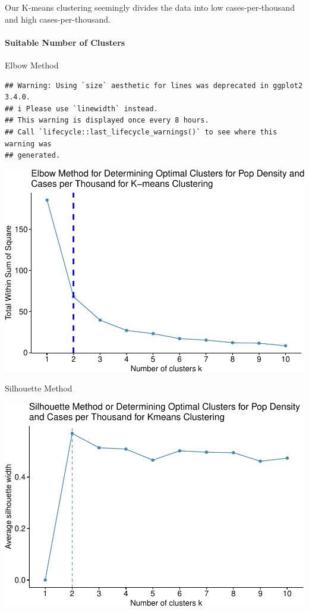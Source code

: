 \documentclass[
]{article}
\begin{document}
Our K-means clustering seemingly divides the data into low
cases-per-thousand and high cases-per-thousand.

\paragraph{Suitable Number of
Clusters}\label{suitable-number-of-clusters-2}

Elbow Method

\begin{verbatim}
## Warning: Using `size` aesthetic for lines was deprecated in ggplot2 3.4.0.
## i Please use `linewidth` instead.
## This warning is displayed once every 8 hours.
## Call `lifecycle::last_lifecycle_warnings()` to see where this warning was
## generated.
\end{verbatim}

\includegraphics{Final-Report_files/figure-latex/unnamed-chunk-10-1.pdf}

Silhouette Method

\includegraphics{Final-Report_files/figure-latex/unnamed-chunk-11-1.pdf}
\end{document}
